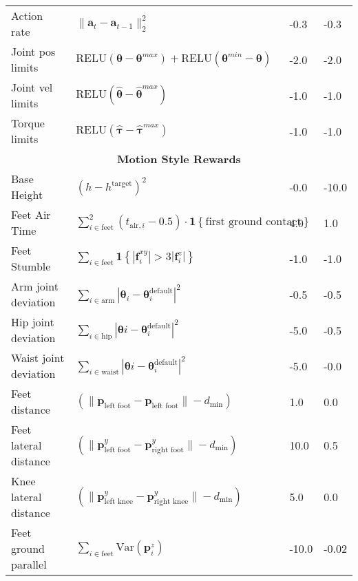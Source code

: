 \begin{appendices}
\begin{table*}[!h]
\begin{tabular}{llll}
    Action rate & $\|\mathbf{a}_t-\mathbf{a}_{t-1}\|_2^2$ & -0.3 & -0.3 \\[0.4ex]
    Joint pos limits & $\text{RELU}(\boldsymbol{\theta} - \boldsymbol{\theta}^{max}) + \text{RELU}(\boldsymbol{\theta}^{min} - \boldsymbol{\theta})$ & -2.0 & -2.0\\[0.4ex]
    Joint vel limits & $\text{RELU}(\boldsymbol{\hat{\theta}} - \boldsymbol{\hat{\theta}}^{max})$ & -1.0 & -1.0\\[0.4ex]
    Torque limits & $\text{RELU}(\boldsymbol{\hat{\tau}} - \boldsymbol{\hat{\tau}}^{max})$ & -1.0 & -1.0 \\[0.4ex]
    \toprule[1.0pt] \multicolumn{4}{c}{\textbf{Motion Style Rewards}} \\ [0.4ex]
    Base Height & $\left(h - h^{\text {target}}\right)^2$ & -0.0 & -10.0 \\ [0.2ex]
    Feet Air Time & $\sum_{i\in \text{feet}}^2 \left( t_{\text{air}, i} - 0.5 \right) \cdot \mathbf{1}\left\{\text{first ground contact} \right\}$ & 4.0 & 1.0 \\[0.4ex]
    Feet Stumble & $\sum_{i\in \text{feet}}\mathbf{1}\left\{\left|\boldsymbol{f}_i^{x y}\right|>3\left|\boldsymbol{f}_i^z\right|\right\}$ & -1.0 & -1.0 \\[0.4ex]
    Arm joint deviation & $\sum_{i \in \text{arm}}|\boldsymbol{\theta}_{i} - \boldsymbol{\theta}^{\text{default}}_{i}|^{2}$ & -0.5 & -0.5\\[0.4ex]
    Hip joint deviation & $\sum_{i \in \text{hip}}|\boldsymbol{\theta}{i} - \boldsymbol{\theta}^{\text{default}}_{i}|^{2}$ & -5.0 & -0.5\\[0.4ex]
    Waist joint deviation & $\sum_{i \in \text{waist}}|\boldsymbol{\theta}{i} - \boldsymbol{\theta}^{\text{default}}_{i}|^{2}$ & -5.0 & -0.0\\[0.4ex]
    Feet distance & $\left(\|\mathbf{p}_\text{left foot} - \mathbf{p}_\text{left foot}\| - d_\text{min} \right)$ & 1.0 & 0.0\\[0.4ex]
    Feet lateral distance & $\left(\|\mathbf{p}^y_\text{left foot} - \mathbf{p}^y_\text{right foot}\| - d_\text{min} \right)$ & 10.0 & 0.5\\[0.4ex]
    Knee lateral distance & $\left(\|\mathbf{p}^y_\text{left knee} - \mathbf{p}^y_\text{right knee}\| - d_\text{min} \right)$ & 5.0 & 0.0\\[0.4ex]
    Feet ground parallel & $\sum_{i\in\text{feet}}\text{Var}(\boldsymbol{p}_i^z)$ & -10.0 & -0.02 \\[0.4ex]
    \bottomrule[1.5pt]
    \end{tabular}
    \label{reward}
\end{table*}

\end{appendices}
